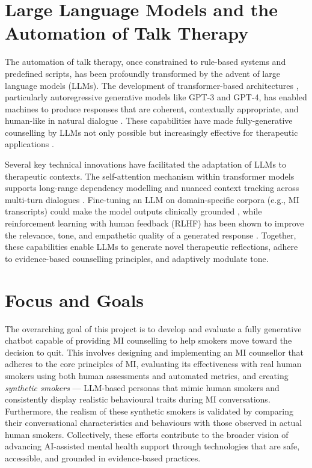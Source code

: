 \section{Large Language Models and the Automation of Talk Therapy}
The automation of talk therapy, once constrained to rule-based systems and predefined
scripts, has been profoundly transformed by the advent of large language models (LLMs).
The development of transformer-based architectures \cite{vaswani2017attention},
particularly autoregressive generative models like GPT-3 and GPT-4, has enabled
machines to produce responses that are coherent, contextually appropriate, and
human-like in natural dialogue \cite{openai2023gpt4}. These capabilities have made
fully-generative counselling by LLMs not only possible but increasingly effective for
therapeutic applications \cite{miner2020artificial, LEE2021856}.

Several key technical innovations have facilitated the adaptation of LLMs to
therapeutic contexts. The self-attention mechanism within transformer models supports
long-range dependency modelling and nuanced context tracking across multi-turn
dialogues \cite{vaswani2017attention}. Fine-tuning an LLM on domain-specific corpora
(e.g., MI transcripts) could make the model outputs clinically grounded
\cite{kong2025llmtherapistssalespeopleevaluating}, while reinforcement learning with
human feedback (RLHF) has been shown to improve the relevance, tone, and empathetic
quality of a generated response \cite{10.5555/3600270.3602281}. Together, these
capabilities enable LLMs to generate novel therapeutic reflections, adhere to
evidence-based counselling principles, and adaptively modulate tone.

\section{Focus and Goals}
The overarching goal of this project is to develop and evaluate a fully generative
chatbot capable of providing MI counselling to help smokers move toward the decision to
quit. This involves designing and implementing an MI counsellor that adheres to the
core principles of MI, evaluating its effectiveness with real human smokers using both
human assessments and automated metrics, and creating \emph{synthetic smokers} ---
LLM-based personas that mimic human smokers and consistently display realistic
behavioural traits during MI conversations. Furthermore, the realism of these synthetic
smokers is validated by comparing their conversational characteristics and behaviours
with those observed in actual human smokers. Collectively, these efforts contribute to
the broader vision of advancing AI-assisted mental health support through technologies
that are safe, accessible, and grounded in evidence-based practices.

